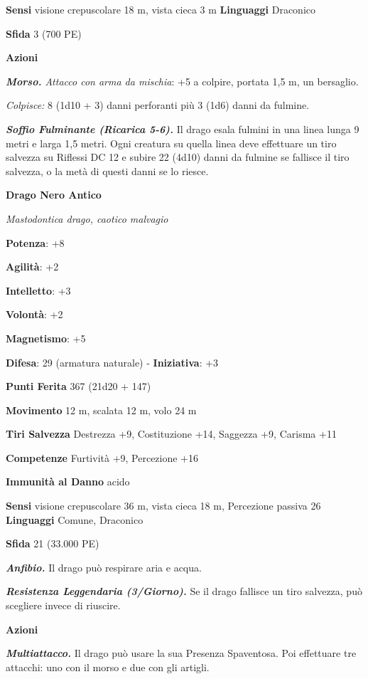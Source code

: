 \begin{multicols}{2}
\textbf{Sensi} visione crepuscolare 18 m, vista cieca 3 m
\textbf{Linguaggi} Draconico

\textbf{Sfida} 3 (700 PE)

\textbf{Azioni}

\emph{\textbf{Morso.} Attacco con arma da mischia}: +5 a colpire,
portata 1,5 m, un bersaglio.

\emph{Colpisce:} 8 (1d10 + 3) danni perforanti più 3 (1d6) danni da
fulmine.

\emph{\textbf{Soffio Fulminante (Ricarica 5-6).}} Il drago esala fulmini
in una linea lunga 9 metri e larga 1,5 metri. Ogni creatura su quella
linea deve effettuare un tiro salvezza su Riflessi DC 12 e subire 22
(4d10) danni da fulmine se fallisce il tiro salvezza, o la metà di
questi danni se lo riesce.

\textbf{Drago Nero Antico}

\emph{Mastodontica drago, caotico malvagio}

\textbf{Potenza}: +8

\textbf{Agilità}: +2

\textbf{Intelletto}: +3

\textbf{Volontà}: +2

\textbf{Magnetismo}: +5

\textbf{Difesa}: 29 (armatura naturale) - \textbf{Iniziativa}: +3

\textbf{Punti Ferita} 367 (21d20 + 147)

\textbf{Movimento} 12 m, scalata 12 m, volo 24 m

\textbf{Tiri Salvezza} Destrezza +9, Costituzione +14, Saggezza +9,
Carisma +11

\textbf{Competenze} Furtività +9, Percezione +16

\textbf{Immunità al Danno} acido

\textbf{Sensi} visione crepuscolare 36 m, vista cieca 18 m, Percezione passiva
26 \textbf{Linguaggi} Comune, Draconico

\textbf{Sfida} 21 (33.000 PE)

\emph{\textbf{Anfibio.}} Il drago può respirare aria e acqua.

\emph{\textbf{Resistenza Leggendaria (3/Giorno).}} Se il drago fallisce
un tiro salvezza, può scegliere invece di riuscire.

\textbf{Azioni}

\emph{\textbf{Multiattacco.}} Il drago può usare la sua Presenza
Spaventosa. Poi effettuare tre attacchi: uno con il morso e due con gli
artigli.


\end{multicols}
